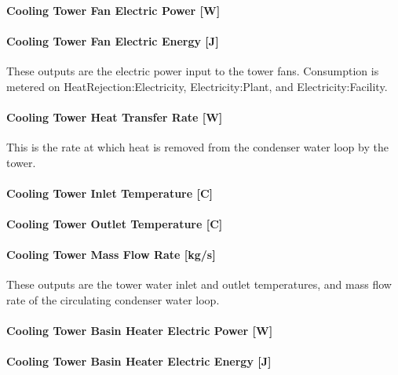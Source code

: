 \paragraph{Cooling Tower Fan Electric Power {[}W{]}}\label{cooling-tower-fan-electric-power-w}

\paragraph{Cooling Tower Fan Electric Energy {[}J{]}}\label{cooling-tower-fan-electric-energy-j}

These outputs are the electric power input to the tower fans. Consumption is metered on HeatRejection:Electricity, Electricity:Plant, and Electricity:Facility.

\paragraph{Cooling Tower Heat Transfer Rate {[}W{]}}\label{cooling-tower-heat-transfer-rate-w}

This is the rate at which heat is removed from the condenser water loop by the tower.

\paragraph{Cooling Tower Inlet Temperature {[}C{]}}\label{cooling-tower-inlet-temperature-c}

\paragraph{Cooling Tower Outlet Temperature {[}C{]}}\label{cooling-tower-outlet-temperature-c}

\paragraph{Cooling Tower Mass Flow Rate {[}kg/s{]}}\label{cooling-tower-mass-flow-rate-kgs}

These outputs are the tower water inlet and outlet temperatures, and mass flow rate of the circulating condenser water loop.

\paragraph{Cooling Tower Basin Heater Electric Power {[}W{]}}\label{cooling-tower-basin-heater-electric-power-w}

\paragraph{Cooling Tower Basin Heater Electric Energy {[}J{]}}\label{cooling-tower-basin-heater-electric-energy-j}

